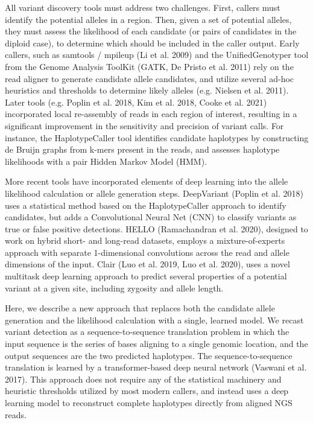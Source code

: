 \documentclass[]{article}
\begin{document}
All variant discovery tools must address two challenges. First, callers must identify the potential alleles in a region. Then, given a set of potential alleles, they must assess the likelihood of each candidate (or pairs of candidates in the diploid case), to determine which should be included in the caller output. Early callers, such as samtools / mpileup (Li et al. 2009) and the UnifiedGenotyper tool from the Genome Analysis ToolKit (GATK, De Pristo et al. 2011) rely on the read aligner to generate candidate allele candidates, and utilize several ad-hoc heuristics and thresholds to determine likely alleles (e.g. Nielsen et al. 2011). Later tools (e.g. Poplin et al. 2018, Kim et al. 2018, Cooke et al. 2021) incorporated local re-assembly of reads in each region of interest, resulting in a significant improvement in the sensitivity and precision of variant calls. For instance, the HaplotypeCaller tool identifies candidate haplotypes by constructing de Bruijn graphs from k-mers present in the reads, and assesses haplotype likelihoods with a pair Hidden Markov Model (HMM). 

More recent tools have incorporated elements of deep learning into the allele likelihood calculation or allele generation steps. DeepVariant (Poplin et al. 2018) uses a statistical method based on the HaplotypeCaller approach to identify candidates, but adds a Convolutional Neural Net (CNN) to classify variants as true or false positive detections. HELLO (Ramachandran et al. 2020), designed to work on hybrid short- and long-read datasets, employs a mixture-of-experts approach with separate 1-dimensional convolutions across the read and allele dimensions of the input. Clair (Luo et al. 2019, Luo et al. 2020), uses a novel multitask deep learning approach to predict several properties of a potential variant at a given site, including zygosity and allele length. 

Here, we describe a new approach that replaces both the candidate allele generation and the likelihood calculation with a single, learned model. We recast variant detection as a sequence-to-sequence translation problem in which the input sequence is the series of bases aligning to a single genomic location, and the output sequences are the two predicted haplotypes. The sequence-to-sequence translation is learned by a transformer-based deep neural network (Vaswani et al. 2017). This approach does not require any of the statistical machinery and heuristic thresholds utilized by most modern callers, and instead uses a deep learning model to reconstruct complete haplotypes directly from aligned NGS reads. 
\end{document}
